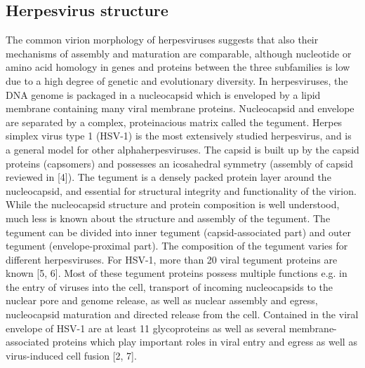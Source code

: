 \subsection{Herpesvirus structure}
The common virion morphology of herpesviruses suggests that also their mechanisms of assembly and maturation are comparable, although nucleotide or amino acid homology in genes and proteins between the three subfamilies is low due to a high degree of genetic and evolutionary diversity.
In herpesviruses, the DNA genome is packaged in a nucleocapsid which is enveloped by a lipid membrane containing many viral membrane proteins.
Nucleocapsid and envelope are separated by a complex, proteinacious matrix called the tegument.
Herpes simplex virus type 1 (HSV-1) is the most extensively studied herpesvirus, and is a general model for other alphaherpesviruses.
The capsid is built up by the capsid proteins (capsomers) and possesses an icosahedral symmetry (assembly of capsid reviewed in [4]).
The tegument is a densely packed protein layer around the nucleocapsid, and essential for structural integrity and functionality of the virion.
While the nucleocapsid structure and protein composition is well understood, much less is known about the structure and assembly of the tegument.
The tegument can be divided into inner tegument (capsid-associated part) and outer tegument (envelope-proximal part).
The composition of the tegument varies for different herpesviruses.
For HSV-1, more than 20 viral tegument proteins are known [5, 6].
Most of these tegument proteins possess multiple functions e.g.
in the entry of viruses into the cell, transport of incoming nucleocapsids to the nuclear pore and genome release, as well as nuclear assembly and egress, nucleocapsid maturation and directed release from the cell.
Contained in the viral envelope of HSV-1 are at least 11 glycoproteins as well as several membrane-associated proteins which play important roles in viral entry and egress as well as virus-induced cell fusion [2, 7].


